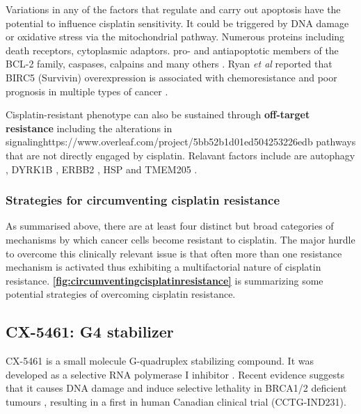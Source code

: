Variations in any of the factors that regulate and carry out apoptosis have the potential to influence cisplatin sensitivity. It could be triggered by DNA damage or oxidative stress via the mitochondrial pathway. Numerous proteins including death receptors, cytoplasmic adaptors. pro- and antiapoptotic members of the BCL-2 family, caspases, calpains and many others \cite{jain2011molecular, janson2010resistance, michaud2009bcl}. Ryan \textit{et al} reported that BIRC5 (Survivin) overexpression is associated with chemoresistance and poor prognosis in multiple types of cancer \cite{ryan2009survivin}. 

Cisplatin-resistant phenotype can also be sustained through \textbf{off-target resistance} including the alterations in signalinghttps://www.overleaf.com/project/5bb52b1d01ed504253226edb pathways that are not directly engaged by cisplatin. Relavant factors include are autophagy \cite{tan2019trp14}, DYRK1B \cite{hu2010depleting}, ERBB2 \cite{fijolek2006p53}, HSP \cite{ren2008down} and TMEM205 \cite{shen2010elevated}.


\subsubsection{Strategies for circumventing cisplatin resistance}
As summarised above, there are at least four distinct but broad categories of mechanisms by which cancer cells become resistant to cisplatin. The major hurdle to overcome this clinically relevant issue is that often more than one resistance mechanism is activated thus exhibiting a multifactorial nature of cisplatin resistance.  \textbf{\autoref{fig:circumventingcisplatinresistance}} is summarizing some potential strategies of overcoming cisplatin resistance. 


\subsection{CX-5461: G4 stabilizer} 
CX-5461 is a small molecule G-quadruplex stabilizing compound. It was developed as a selective RNA polymerase I inhibitor \cite{drygin2011targeting}. Recent evidence suggests that it causes DNA damage and induce selective lethality in BRCA1/2 deficient tumours \cite{xu2017cx}, resulting in a first in human Canadian clinical trial (CCTG-IND231). 
 
